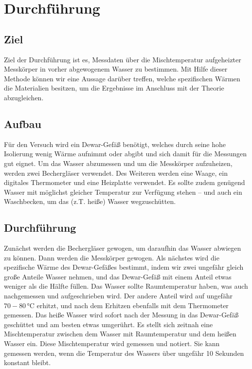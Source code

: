 \section{Durchführung}
\label{sec:Durchführung}
\subsection{Ziel}
Ziel der Durchführung ist es, Messdaten über die Mischtemperatur aufgeheizter Messkörper in vorher abgewogenem Wasser zu bestimmen.
Mit Hilfe dieser Methode können wir eine Aussage darüber treffen, welche spezifischen Wärmen die Materialien besitzen, um die Ergebnisse im Anschluss mit der Theorie abzugleichen. %

\subsection{Aufbau}
Für den Versuch wird ein Dewar-Gefäß benötigt, welches durch seine hohe Isolierung wenig Wärme aufnimmt oder abgibt und sich damit für die Messungen gut eignet. %
Um das Wasser abzumessen und um die Messkörper aufzuheizen, werden zwei Bechergläser verwendet.
Des Weiteren werden eine Waage, ein digitales Thermometer und eine Heizplatte verwendet.
Es sollte zudem genügend Wasser mit möglichst gleicher Temperatur zur Verfügung stehen -- und auch ein Waschbecken, um das (z.T. heiße) Wasser wegzuschütten. %

\subsection{Durchführung}
Zunächst werden die Bechergläser gewogen, um daraufhin das Wasser abwiegen zu können. Dann werden die Messkörper gewogen.
Als nächstes wird die spezifische Wärme des Dewar-Gefäßes bestimmt, indem wir zwei ungefähr gleich große Anteile Wasser nehmen, und das Dewar-Gefäß %
mit einem Anteil etwas weniger als die Hälfte füllen. Das Wasser sollte Raumtemperatur haben, was auch nachgemessen und aufgeschrieben wird.
Der andere Anteil wird auf ungefähr $70-80 \, \si{\celsius}$ erhitzt, und nach dem Erhitzen ebenfalls mit dem Thermometer gemessen. %
Das heiße Wasser wird sofort nach der Messung in das Dewar-Gefäß geschüttet und am besten etwas umgerührt.
Es stellt sich zeitnah eine Mischtemperatur zwischen dem Wasser mit Raumtemperatur und dem heißen Wasser ein.
Diese Mischtemperatur wird gemessen und notiert. Sie kann gemessen werden, wenn die Temperatur des Wassers über ungefähr 10 Sekunden konstant bleibt.

